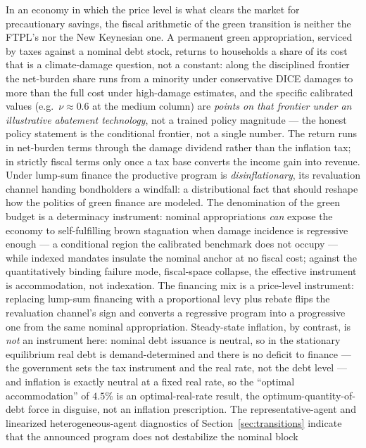 \documentclass[12pt]{article}
\begin{document}
In an economy in which the price level is what clears the market for
precautionary savings, the fiscal arithmetic of the green transition is
neither the FTPL's nor the New Keynesian one. A permanent green appropriation,
serviced by taxes against a nominal debt stock, returns to households a share
of its cost that is a climate-damage question, not a constant: along the
disciplined frontier the net-burden share runs from a minority under
conservative DICE damages to more than the full cost under high-damage
estimates, and the specific calibrated values (e.g.\ $\nu\approx0.6$ at the
medium column) are \emph{points on that frontier under an illustrative
abatement technology}, not a trained policy magnitude --- the honest policy
statement is the conditional frontier, not a single number. The return runs in
net-burden terms through the damage dividend rather
than the inflation tax; in strictly fiscal terms only once a tax base
converts the income gain into revenue. Under lump-sum finance the
productive program is \emph{disinflationary}, its revaluation channel handing
bondholders a windfall: a distributional fact that should reshape how the
politics of green finance are modeled. The denomination of the green budget
is a determinacy instrument: nominal appropriations \emph{can} expose the
economy to self-fulfilling brown stagnation when damage incidence is
regressive enough --- a conditional region the calibrated benchmark does
not occupy --- while indexed mandates insulate the nominal anchor at no
fiscal cost; against the quantitatively binding failure mode, fiscal-space
collapse, the effective instrument is accommodation, not indexation. The
financing mix is a price-level instrument: replacing lump-sum
financing with a proportional levy plus rebate flips the revaluation
channel's sign and converts a regressive program into a progressive one
from the same nominal appropriation. Steady-state inflation, by contrast,
is \emph{not} an instrument here: nominal debt issuance is neutral, so in
the stationary equilibrium real debt is demand-determined and there is no
deficit to finance --- the government sets the tax instrument and the real
rate, not the debt level --- and inflation is exactly neutral at a fixed
real rate, so the ``optimal accommodation'' of $4.5\%$ is an
optimal-real-rate result, the \citet{aiyagarimcgrattan1998}
optimum-quantity-of-debt force in disguise, not an inflation prescription.
The representative-agent and linearized heterogeneous-agent diagnostics of
Section~\ref{sec:transitions}
indicate that the announced program does not destabilize the nominal block
\end{document}
